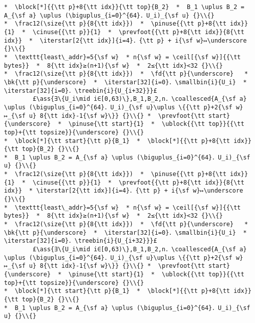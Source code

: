 \documentclass[10pt,twoside]{report}
\makeatletter
\newcommand{\ml}[2][t]{\mbox{\mdseries\begin{tabular}[#1]{@{}L@{}}#2\end{tabular}}}
\newcommand{\ass}[1]{\ensuremath{{\color{blue}\left\{\ml[c]{#1}\right\}}}}
\renewcommand{\ceil}[2][]{\left\lceil{#2}\right\rceil_{#1}}
\newcommand{\iterstar}[2][]{\text{\LARGE $*$}^{#1}_{#2}}
\makeatother
\begin{document}
\begin{lstlisting}
*  \block[*]{{\tt p}+8{\tt idx}}{\tt top}{B_2}  *  B_1 \uplus B_2 = A_{\sf a} \uplus (\biguplus_{i=0}^{64}．U_i)_{\sf u} {}\\{}
*  \frac12(\size{\tt p}{8{\tt idx}})  *  \pinuse{{\tt p}+8{\tt idx}}{1}  *  \cinuse{{\tt p}}{1}  *  \prevfoot{{\tt p}+8{\tt idx}}{8{\tt idx}}  *  \iterstar[2{\tt idx}]{i=4}．{\tt p} + i{\sf w}↦\underscore {}\\{}
*  \texttt{least\_addr}=5{\sf w}  * n{\sf w} = \ceil[{\sf w}]{{\tt bytes}}  *  8{\tt idx}≥(n+1){\sf w}  *  2≤{\tt idx}<32 {}\\{}
*  \frac12(\size{\tt p}{8{\tt idx}})  *  \fd{\tt p}{\underscore}   *  \bk{\tt p}{\underscore}  *  \iterstar[32]{i=0}．\smallbin{i}{U_i}  *  \iterstar[32]{i=0}．\treebin{i}{U_{i+32}}}£ 
        £\ass{∃\{U_i\mid i∈[0,63)\},B_1,B_2,n．\coallesced{A_{\sf a} \uplus (\biguplus_{i=0}^{64}．U_i)_{\sf u}\uplus \{{\tt p}+2{\sf w}↦_{\sf u} 8{\tt idx}-1{\sf w}\}} {}\\{} *  \prevfoot{\tt start}{\underscore}  *  \pinuse{\tt start}{1}  *  \ublock{{\tt top}}{{\tt top}+{\tt topsize}}{\underscore} {}\\{}
*  \block[*]{\tt start}{\tt p}{B_1}  *  \block[*]{{\tt p}+8{\tt idx}}{\tt top}{B_2} {}\\{}
*  B_1 \uplus B_2 = A_{\sf a} \uplus (\biguplus_{i=0}^{64}．U_i)_{\sf u} {}\\{}
*  \frac12(\size{\tt p}{8{\tt idx}})  *  \pinuse{{\tt p}+8{\tt idx}}{1}  *  \cinuse{{\tt p}}{1}  *  \prevfoot{{\tt p}+8{\tt idx}}{8{\tt idx}}  * \iterstar[2{\tt idx}]{i=4}．{\tt p} + i{\sf w}↦\underscore {}\\{}
*  \texttt{least\_addr}=5{\sf w}  * n{\sf w} = \ceil[{\sf w}]{{\tt bytes}}  *  8{\tt idx}≥(n+1){\sf w}  *  2≤{\tt idx}<32 {}\\{}
*  \frac12(\size{\tt p}{8{\tt idx}})  *  \fd{\tt p}{\underscore}   *  \bk{\tt p}{\underscore}  *  \iterstar[32]{i=0}．\smallbin{i}{U_i}  *  \iterstar[32]{i=0}．\treebin{i}{U_{i+32}}}£ 
        £\ass{∃\{U_i\mid i∈[0,63)\},B_1,B_2,n．\coallesced{A_{\sf a} \uplus (\biguplus_{i=0}^{64}．U_i)_{\sf u}\uplus \{{\tt p}+2{\sf w}↦_{\sf u} 8{\tt idx}-1{\sf w}\}} {}\\{} *  \prevfoot{\tt start}{\underscore}  *  \pinuse{\tt start}{1}  *  \ublock{{\tt top}}{{\tt top}+{\tt topsize}}{\underscore} {}\\{}
*  \block[*]{\tt start}{\tt p}{B_1}  *  \block[*]{{\tt p}+8{\tt idx}}{\tt top}{B_2} {}\\{}
*  B_1 \uplus B_2 = A_{\sf a} \uplus (\biguplus_{i=0}^{64}．U_i)_{\sf u} {}\\{}

\end{lstlisting}
\end{document}
